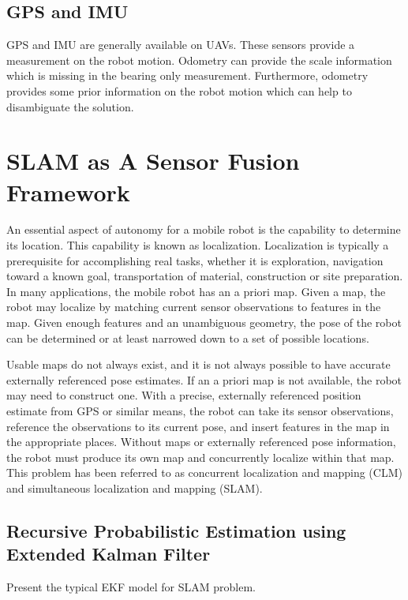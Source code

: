 \subsection{GPS and IMU}\label{sec:gps_and_imu}
GPS and IMU are generally available on UAVs. These sensors provide a 
measurement on the robot motion. Odometry can provide the scale 
information which is missing in the bearing only measurement. 
Furthermore, odometry provides some prior information on the robot 
motion which can help to disambiguate the solution.

\section{SLAM as A Sensor Fusion Framework}
\label{sec:SLAM}
An essential aspect of autonomy for a mobile robot is the capability to 
determine its location. This capability is known as localization. 
Localization is typically a prerequisite for accomplishing real tasks, 
whether it is exploration, navigation toward a known goal, 
transportation of material, construction or site preparation. In many 
applications, the mobile robot has an a priori map. Given a map, the 
robot may localize by matching current sensor observations to features 
in the map. Given enough features and an unambiguous geometry, the pose 
of the robot can be determined or at least narrowed down to a set of 
possible locations.

Usable maps do not always exist, and it is not always possible to have 
accurate externally referenced pose estimates. If an a priori map is not 
available, the robot may need to construct one. With a precise, 
externally referenced position estimate from GPS or similar means, the 
robot can take its sensor observations, reference the observations to 
its current pose, and insert features in the map in the appropriate 
places. Without maps or externally referenced pose information, the 
robot must produce its own map and concurrently localize within that 
map. This problem has been referred to as concurrent localization and 
mapping (CLM) and simultaneous localization and mapping (SLAM).

\subsection{Recursive Probabilistic Estimation using Extended Kalman Filter}
\label{sec:SLAM_using_EKF}

Present the typical EKF model for SLAM problem. 

